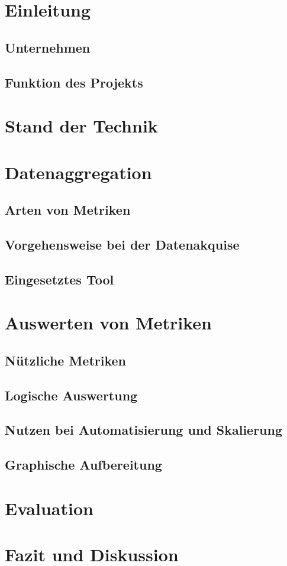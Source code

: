 \documentclass[a4paper,12pt]{scrartcl}
\title{}
\author{Johannes Bohlig}
\date{\today}
\begin{document}
\iffalse
 
\fi

\tableofcontents

\pagebreak

\section{Einleitung}
\subsection{Unternehmen}
\subsection{Funktion des Projekts}
\section{Stand der Technik}
\section{Datenaggregation}
\subsection{Arten von Metriken}
\subsection{Vorgehensweise bei der Datenakquise}
\subsection{Eingesetztes Tool}
\section{Auswerten von Metriken}
\subsection{Nützliche Metriken}
\subsection{Logische Auswertung}
\subsection{Nutzen bei Automatisierung und Skalierung}
\subsection{Graphische Aufbereitung}
\section{Evaluation}
\section{Fazit und Diskussion}
\end{document}
